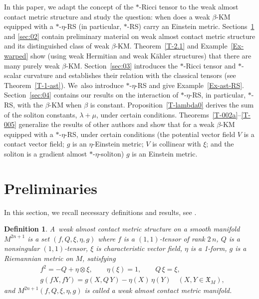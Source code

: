 \documentclass[11pt,a4paper,twoside]{article}
\newtheorem{definition}{Definition}%
\begin{document}
{In this paper, we adapt the concept of the $\ast$-Ricci tensor to the weak almost contact metric structure and study
the question: when does a weak $\beta$-KM equipped with a $\ast$-$\eta$-RS (in particu\-lar, $\ast$-RS) carry an Einstein metric.
Sections~\ref{sec:01} and \ref{sec:02} contain preliminary material on weak almost contact metric structure and its distinguished class of weak $\beta$-KM.
Theorem~\ref{T-2.1} and Example~\ref{Ex-warped} show (using weak Hermitian and weak K\"{a}hler structures) that there are many purely weak $\beta$-KM.
Section~\ref{sec:03} introduces the $\ast$-Ricci tensor and $\ast$-scalar curvature and establishes their relation with the classical tensors (see Theorem~\ref{T-1-ast}).
We~also introduce  $\ast$-$\eta$-RS and give Example~\ref{Ex-ast-RS}.
Section~\ref{sec:04} contains our results on the interaction of $\ast$-$\eta$-RS, in particular, $\ast$-RS, with the $\beta$-KM when $\beta$ is constant.
Proposition~\ref{T-lambda0} derives the sum of the soliton constants, $\lambda+\mu$, under certain conditions.
Theorems~\ref{T-002a}--\ref{T-005} generalize the results of other authors and show that for a weak $\beta$-KM equipped with a $\ast$-$\eta$-RS, under certain conditions (the potential vector field $V$ is a contact vector field; $g$ is an $\eta$-Einstein metric; $V$ is collinear with $\xi$; and the soliton is a gradient almost $\ast$-$\eta$-soliton) $g$ is an Einstein metric.


\section{Preliminaries}
\label{sec:01}

In this section, we recall necessary definitions and results, see \cite{rst-55,RWo-2,rov-126}.

\begin{definition}\label{D-basic}
\rm
A~\textit{weak almost contact metric structure} on a smooth manifold $M^{2n+1}$ is a set $(f,Q,\xi,\eta,g)$ where
${f}$ is a $(1,1)$-tensor of rank $2\,n$, $Q$ is a nonsingular $(1,1)$-tensor,
$\xi$ is characteristic vector field, ${\eta}$ is a 1-form, $g$ is a Riemannian metric on $M$, satisfying
\begin{align}\label{2.1}
 & {f}^2 = -Q + {\eta}\otimes {\xi},\qquad {\eta}({\xi})=1,\qquad Q\,{\xi} = {\xi}, \\
\label{2.2}
 & g({f} X,{f} Y)= g(X,Q\,Y) - {\eta}(X)\,{\eta}(Y)\quad (X,Y\in\mathfrak{X}_M),
\end{align}
and $M^{2n+1}({f},Q,{\xi},{\eta},g)$ is called a \textit{weak almost contact metric manifold}.
\end{definition}

}
\end{document}
